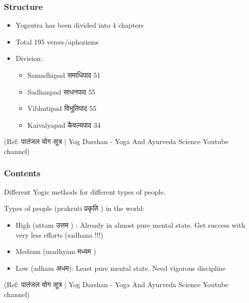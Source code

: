 \begin{frame}[fragile]\frametitle{Structure}

	\begin{itemize}
	\item Yogsutra has been divided into 4 chapters
	\item Total 195 verses/aphorisms
	\item Division:
		\begin{itemize}
		\item Samadhipad समाधिपाद 51
		\item Sadhanpad साधनपाद 55
		\item Vibhutipad विभूतिपाद 55
		\item Kaivalyapad कैवल्यपाद 34
		\end{itemize}	
	\end{itemize}

\tiny{(Ref: पातंजल योग सूत्र | Yog Darshan - Yoga And Ayurveda Science Youtube channel)}

\end{frame}

\begin{frame}[fragile]\frametitle{Contents}

Different Yogic methods for different types of people.

Types of people (prakruti प्रकृति ) in the world:

	\begin{itemize}
	\item High (uttam उत्तम ) : Already in almost pure mental state. Get success with very less efforts (sadhana !!!) 
	\item Medium (madhyam मध्यम )
	\item Low (adham अधम): Least pure mental state. Need vigorous discipline
	\end{itemize}
	
\tiny{(Ref: पातंजल योग सूत्र | Yog Darshan - Yoga And Ayurveda Science Youtube channel)}

\end{frame}

